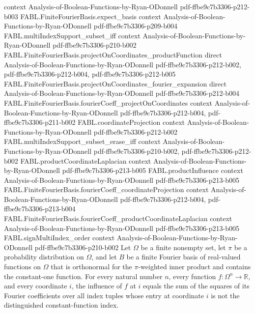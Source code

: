 \begin{theorem}
  {context}
  {Analysis-of-Boolean-Functions-by-Ryan-ODonnell}
  {pdf-ffbe9c7b3306-p212-b003}
\proofstep
  {FABL.FiniteFourierBasis.expect_basis}
  {context}
  {Analysis-of-Boolean-Functions-by-Ryan-ODonnell}
  {pdf-ffbe9c7b3306-p209-b004}
\proofstep
  {FABL.multiIndexSupport_subset_iff}
  {context}
  {Analysis-of-Boolean-Functions-by-Ryan-ODonnell}
  {pdf-ffbe9c7b3306-p210-b002}
\proofstep
  {FABL.FiniteFourierBasis.projectOnCoordinates_productFunction}
  {direct}
  {Analysis-of-Boolean-Functions-by-Ryan-ODonnell}
  {pdf-ffbe9c7b3306-p212-b002,
    pdf-ffbe9c7b3306-p212-b004,
    pdf-ffbe9c7b3306-p212-b005}
\proofstep
  {FABL.FiniteFourierBasis.projectOnCoordinates_fourier_expansion}
  {direct}
  {Analysis-of-Boolean-Functions-by-Ryan-ODonnell}
  {pdf-ffbe9c7b3306-p212-b004}
\proofstep
  {FABL.FiniteFourierBasis.fourierCoeff_projectOnCoordinates}
  {context}
  {Analysis-of-Boolean-Functions-by-Ryan-ODonnell}
  {pdf-ffbe9c7b3306-p212-b004,
    pdf-ffbe9c7b3306-p211-b002}
\proofstep
  {FABL.coordinateProjection}
  {context}
  {Analysis-of-Boolean-Functions-by-Ryan-ODonnell}
  {pdf-ffbe9c7b3306-p212-b002}
\proofstep
  {FABL.multiIndexSupport_subset_erase_iff}
  {context}
  {Analysis-of-Boolean-Functions-by-Ryan-ODonnell}
  {pdf-ffbe9c7b3306-p210-b002,
    pdf-ffbe9c7b3306-p212-b002}
\proofstep
  {FABL.productCoordinateLaplacian}
  {context}
  {Analysis-of-Boolean-Functions-by-Ryan-ODonnell}
  {pdf-ffbe9c7b3306-p213-b005}
\proofstep
  {FABL.productInfluence}
  {context}
  {Analysis-of-Boolean-Functions-by-Ryan-ODonnell}
  {pdf-ffbe9c7b3306-p213-b005}
\proofstep
  {FABL.FiniteFourierBasis.fourierCoeff_coordinateProjection}
  {context}
  {Analysis-of-Boolean-Functions-by-Ryan-ODonnell}
  {pdf-ffbe9c7b3306-p212-b004,
    pdf-ffbe9c7b3306-p213-b004}
\proofstep
  {FABL.FiniteFourierBasis.fourierCoeff_productCoordinateLaplacian}
  {context}
  {Analysis-of-Boolean-Functions-by-Ryan-ODonnell}
  {pdf-ffbe9c7b3306-p213-b005}
\proofstep
  {FABL.signMultiIndex_order}
  {context}
  {Analysis-of-Boolean-Functions-by-Ryan-ODonnell}
  {pdf-ffbe9c7b3306-p210-b002}
Let $\Omega$ be a finite nonempty set, let $\pi$ be a probability distribution on
$\Omega$, and let $B$ be a finite Fourier basis of real-valued functions on $\Omega$
that is orthonormal for the $\pi$-weighted inner product and contains the constant-one
function. For every natural number $n$, every function $f:\Omega^n\to\mathbb R$, and
every coordinate $i$, the influence of $f$ at $i$ equals the sum of the squares of its
Fourier coefficients over all index tuples whose entry at coordinate $i$ is not the
distinguished constant-function index.
\end{theorem}

